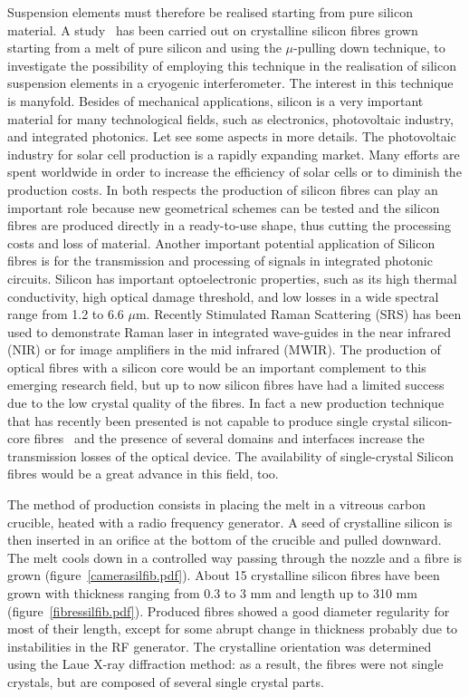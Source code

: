 Suspension elements must therefore be realised starting from
pure silicon material. A study~\cite{articolofibresil} has been
carried out on crystalline silicon fibres grown starting from a
melt of pure silicon and
 using the $\mu$-pulling down technique, to investigate the possibility of employing this technique in the realisation of silicon suspension elements
  in a cryogenic interferometer. The interest in this
  technique is manyfold. Besides of mechanical applications,
  silicon is a very important material for many  technological fields,
  such as electronics, photovoltaic industry, and integrated photonics.
  Let see some aspects in more details. The photovoltaic industry for solar
   cell production is  a rapidly expanding market. Many efforts are spent
   worldwide in order to increase the efficiency of solar cells or to diminish
   the production costs. In both respects the production of silicon fibres
    can play an important role because new geometrical schemes can be tested
    and the silicon fibres are produced directly in a ready-to-use  shape,
    thus cutting the processing costs and loss of material.
Another important potential application of Silicon fibres is
for the transmission and processing of signals in integrated
photonic circuits. Silicon has important optoelectronic
properties, such as its high thermal conductivity, high optical
damage threshold, and low losses in a wide spectral range from
1.2 to 6.6 $\mu$m. Recently Stimulated Raman Scattering (SRS)
has been used to demonstrate Raman laser in integrated
wave-guides in the near infrared (NIR) or for image amplifiers
in the mid infrared (MWIR). The production of optical fibres
with a silicon core would be an important complement to this
emerging research field, but up to now silicon fibres have had
a limited success due to the low crystal quality of the fibres.
In fact a new production technique that has recently been
presented is not capable to produce single crystal silicon-core
fibres~\cite{toncelli1} and the presence of several domains and
interfaces increase the transmission losses of the optical
device. The availability of single-crystal Silicon fibres would
be a great advance in this field, too.


The method of production consists in placing the melt in a
vitreous carbon crucible, heated with a radio frequency
generator. A seed of crystalline silicon is then inserted in an
orifice at the bottom of the crucible and pulled downward. The
melt cools down in a controlled way passing through the nozzle
and a fibre is grown (figure~\ref{camerasilfib.pdf}). About 15
crystalline silicon fibres have been grown
 with thickness ranging from 0.3 to 3 mm and length up to 310 mm (figure~\ref{fibressilfib.pdf}). Produced fibres showed a good diameter regularity for most of
 their length, except for some abrupt change in thickness probably due to instabilities in the RF generator. The crystalline
  orientation was determined using the Laue X-ray diffraction method: as a result, the fibres were not single crystals, but
  are composed of several single crystal parts.


